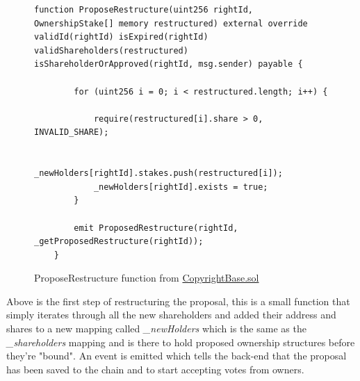 \begin{figure}[H]
\caption{ProposeRestructure function from \href{https://github.com/MrHarrisonBarker/CRPL/blob/main/CRPL.Contracts/contracts/Copyrights/CopyrightBase.sol}{CopyrightBase.sol}}
\centering
\begin{lstlisting}[language=Solidity]
function ProposeRestructure(uint256 rightId, OwnershipStake[] memory restructured) external override validId(rightId) isExpired(rightId) validShareholders(restructured) isShareholderOrApproved(rightId, msg.sender) payable {
        
        for (uint256 i = 0; i < restructured.length; i++) {

            require(restructured[i].share > 0, INVALID_SHARE);

            _newHolders[rightId].stakes.push(restructured[i]);
            _newHolders[rightId].exists = true;
        }   

        emit ProposedRestructure(rightId, _getProposedRestructure(rightId));
    }	
\end{lstlisting}
\end{figure}

Above is the first step of restructuring the proposal, this is a small function that simply iterates through all the new shareholders and added their address and shares to a new mapping called \textit{\_newHolders} which is the same as the \textit{\_shareholders} mapping and is there to hold proposed ownership structures before they're "bound". An event is emitted which tells the back-end that the proposal has been saved to the chain and to start accepting votes from owners.

